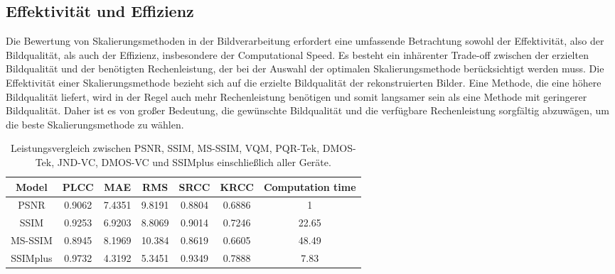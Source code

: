     \subsection{Effektivität und Effizienz}

        Die Bewertung von Skalierungsmethoden in der Bildverarbeitung erfordert eine umfassende Betrachtung sowohl der Effektivität, also der Bildqualität, als auch der Effizienz, insbesondere der Computational Speed. 
        Es besteht ein inhärenter Trade-off zwischen der erzielten Bildqualität und der benötigten Rechenleistung, der bei der Auswahl der optimalen Skalierungsmethode berücksichtigt werden muss.
        Die Effektivität einer Skalierungsmethode bezieht sich auf die erzielte Bildqualität der rekonstruierten Bilder. 
        Eine Methode, die eine höhere Bildqualität liefert, wird in der Regel auch mehr Rechenleistung benötigen und somit langsamer sein als eine Methode mit geringerer Bildqualität. 
        Daher ist es von großer Bedeutung, die gewünschte Bildqualität und die verfügbare Rechenleistung sorgfältig abzuwägen, um die beste Skalierungsmethode zu wählen.


        \begin{table}[!h]
        \centering
        \begin{tabular}{ccccccc}
            \textbf{Model} & \textbf{PLCC} & \textbf{MAE} & \textbf{RMS} & \textbf{SRCC} & \textbf{KRCC} & \textbf{Computation time} \\ \hline
            PSNR           & 0.9062        & 7.4351       & 9.8191       & 0.8804        & 0.6886        & 1                                     \\
            SSIM           & 0.9253        & 6.9203       & 8.8069       & 0.9014        & 0.7246        & 22.65                                 \\
            MS-SSIM        & 0.8945        & 8.1969       & 10.384       & 0.8619        & 0.6605        & 48.49                                 \\
            SSIMplus       & 0.9732        & 4.3192       & 5.3451       & 0.9349        & 0.7888        & 7.83
        \end{tabular}
        \caption{Leistungsvergleich zwischen PSNR, SSIM, MS-SSIM, VQM, PQR-Tek, DMOS-Tek, JND-VC,
DMOS-VC und SSIMplus einschließlich aller Geräte.}
        \label{tab:Leistungsvergleich}
        \end{table}



